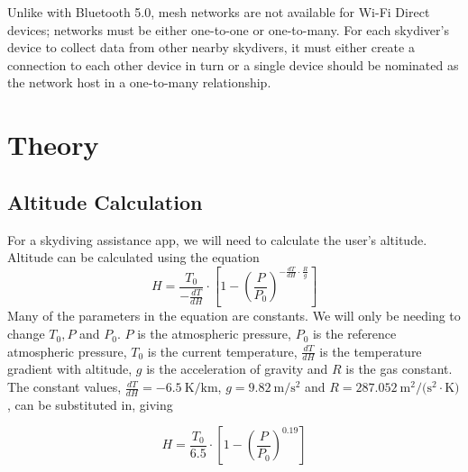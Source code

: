 \documentclass[11pt, a4paper, twocolumn]{article}
\begin{document}
Unlike with Bluetooth 5.0, mesh networks are not available for Wi-Fi Direct devices; networks must be either one-to-one or one-to-many. For each skydiver's device to collect data from other nearby skydivers, it must either create a connection to each other device in turn or a single device should be nominated as the network host in a one-to-many relationship.

\section{Theory}\label{sec:theory} %

\subsection{Altitude Calculation} %
For a skydiving assistance app, we will need to calculate the user's altitude. Altitude can be calculated using the equation
\begin{equation}
    H = \frac{T_0} {-\frac{dT}{dH}} \cdot \left[1-{\left(\frac{P} {P_0}\right)}^{-\frac{dT} {dH} \cdot \frac{R} {g}}\right]
\end{equation}
Many of the parameters in the equation are constants. We will only be needing to change $T_0, P$ and $P_0$. $P$ is the atmospheric pressure, $P_0$ is the reference atmospheric pressure, $T_0$ is the current temperature, $\frac{dT}{dH}$ is the temperature gradient with altitude, $g$ is the acceleration of gravity and $R$ is the gas constant. The constant values, $\frac{dT}{dH} = \SI{-6.5}{\kelvin\per\kilo\metre}$, $g = \SI{9.82}{\metre\per\second\squared}$ and $R = \SI{287.052}{\metre\squared\per(\second\squared\cdot\kelvin)}$, can be substituted in, giving~\cite{he_atmospheric_2012}

\begin{equation}
    H = \frac{T_0} {6.5} \cdot \left[1-{\left(\frac{P} {P_0}\right)}^{0.19}\right]
\end{equation}

\end{document}
